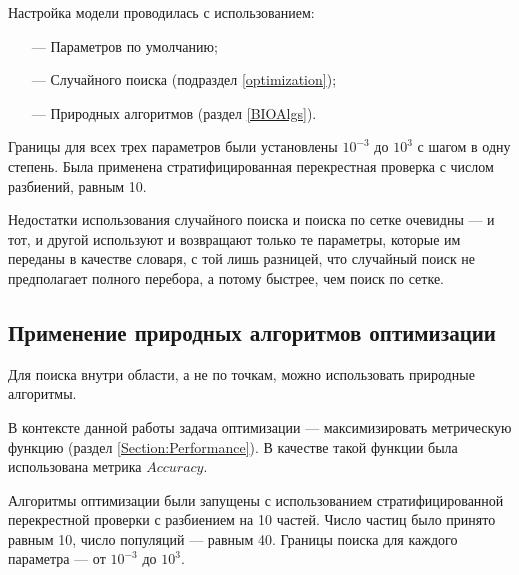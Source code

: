 Настройка модели проводилась с использованием:

\begin{itemize}
    \item[—] Параметров по умолчанию;
    \item[—] Случайного поиска (подраздел \ref{optimization});
    \item[—] Природных алгоритмов (раздел \ref{BIOAlgs}).
\end{itemize}

Границы для всех трех параметров были установлены $10^{-3}$ до $10^3$ с шагом в одну степень.
Была применена стратифицированная перекрестная проверка с числом разбиений, равным 10.

Недостатки использования случайного поиска и поиска по сетке очевидны — и тот, и другой используют и возвращают только те
параметры, которые им переданы в качестве словаря, с той лишь разницей, что случайный поиск не предполагает полного перебора,
а потому быстрее, чем поиск по сетке.

\subsection{Применение природных алгоритмов оптимизации}

Для поиска внутри области, а не по точкам, можно использовать природные алгоритмы.

В контексте данной работы задача оптимизации — максимизировать метрическую функцию (раздел \ref{Section:Performance}).
В качестве такой функции была использована метрика $Accuracy$.

Алгоритмы оптимизации были запущены с использованием стратифицированной перекрестной проверки с разбиением на 10 частей.
Число частиц было принято равным 10, число популяций — равным 40.
Границы поиска для каждого параметра — от $10^{-3}$ до $10^3$.
